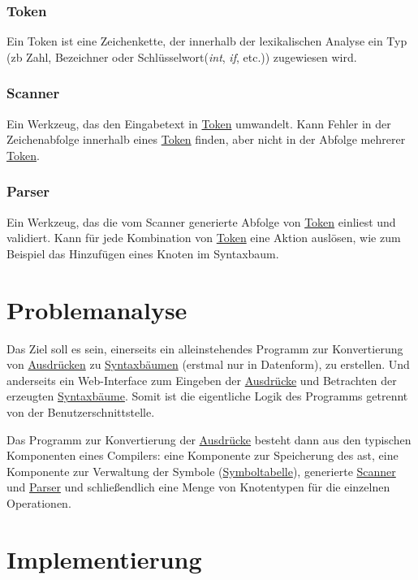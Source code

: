 \documentclass[oneside]{ausarbeitung}
\begin{document}
\subsection{Token}
\label{sub:token}
Ein Token ist eine Zeichenkette, der innerhalb der lexikalischen Analyse ein Typ (\ac{zb} Zahl, Bezeichner oder Schlüsselwort(\textit{int}, \textit{if}, etc.)) zugewiesen wird.

\subsection{Scanner}
\label{sub:scanner}
Ein Werkzeug, das den Eingabetext in \hyperref[sub:token]{Token} umwandelt. Kann Fehler in der Zeichenabfolge innerhalb eines \hyperref[sub:token]{Token} finden, aber nicht in der Abfolge mehrerer \hyperref[sub:token]{Token}.

\subsection{Parser}
\label{sub:parser}
Ein Werkzeug, das die vom Scanner generierte Abfolge von \hyperref[sub:token]{Token} einliest und validiert. Kann für jede Kombination von \hyperref[sub:token]{Token} eine Aktion auslösen, wie zum Beispiel das Hinzufügen eines Knoten im Syntaxbaum.

\chapter{Problemanalyse}
\label{cha:problemanalyse}

Das Ziel soll es sein, einerseits ein alleinstehendes Programm zur Konvertierung von \hyperref[sub:expression]{Ausdrücken} zu \hyperref[sub:syntax_tree]{Syntaxbäumen} (erstmal nur in Datenform), zu erstellen. Und anderseits ein Web-Interface zum Eingeben der \hyperref[sub:expression]{Ausdrücke} und Betrachten der erzeugten \hyperref[sub:syntax_tree]{Syntaxbäume}. Somit ist die eigentliche Logik des Programms getrennt von der Benutzerschnittstelle. 

Das Programm zur Konvertierung der \hyperref[sub:expression]{Ausdrücke} besteht dann aus den typischen Komponenten eines Compilers: eine Komponente zur Speicherung des \ac{ast}, eine Komponente zur Verwaltung der Symbole (\hyperref[sub:symtab]{Symboltabelle}), generierte \hyperref[sub:scanner]{Scanner} und \hyperref[sub:parser]{Parser} und schließendlich eine Menge von Knotentypen für die einzelnen Operationen.

\chapter{Implementierung}
\label{cha:implementierung}
\end{document}
